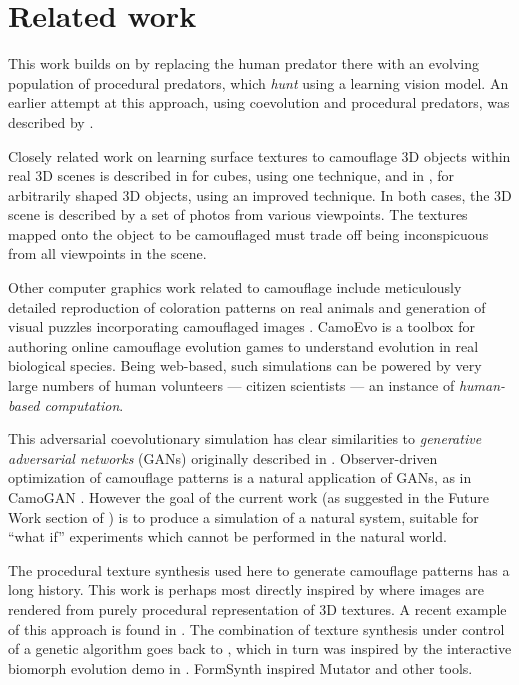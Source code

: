 \documentclass[acmtog]{acmart}
\newcommand{\jargon}[1]{\textit{#1}}
\begin{document}
\section{Related work}
This work builds on \citet{reynolds_iec_2011} by replacing the human predator there with an evolving population of procedural predators, which \jargon{hunt} using a learning vision model. An earlier attempt at this approach, using coevolution and procedural predators, was described by \citet{harrington_coevolution_2014}.
\par
Closely related work on learning surface textures to camouflage 3D objects within real 3D scenes is described in \citet{owens_camouflaging_2014} for cubes, using one technique, and in \citet{guo_ganmouflage_2022}, for arbitrarily shaped 3D objects, using an improved technique. In both cases, the 3D scene is described by a set of photos from various viewpoints. The textures mapped onto the object to be camouflaged must trade off being inconspicuous from all viewpoints in the scene.
\par
Other computer graphics work related to camouflage include meticulously detailed reproduction of coloration patterns on real animals \cite{de_gomensoro_malheiros_leopard_2020} and generation of visual puzzles incorporating camouflaged images \cite{chu_camo_image_2010} \cite{Zhang_Yin_Nie_Zheng_2020}. CamoEvo \cite{hancock_camoevo_2022} is a toolbox for authoring online camouflage evolution games to understand evolution in real biological species. Being web-based, such simulations can be powered by very large numbers of human volunteers — citizen scientists — an instance of \jargon{human-based computation}.
\par
This adversarial coevolutionary simulation has clear similarities to \jargon{generative adversarial networks} (GANs) originally described in \citet{goodfellow_gan_2014}. Observer-driven optimization of camouflage patterns is a natural application of GANs, as in CamoGAN \cite{talas_camogan_2020}. However the goal of the current work (as suggested in the Future Work section of \citet{reynolds_iec_2011}) is to produce a simulation of a natural system, suitable for “what if” experiments which cannot be performed in the natural world.
\par
The procedural texture synthesis used here to generate camouflage patterns has a long history. This work is perhaps most directly inspired by \citet{perlin_image_1985} where images are rendered from purely procedural representation of 3D textures. A recent example of this approach is found in \citet{Guerrero_MatFormer_2022}. The combination of texture synthesis under control of a genetic algorithm goes back to \citet{sims_artificial_1991}, which in turn was inspired by the interactive biomorph evolution demo in \citet{dawkins_blind_1986}. FormSynth \cite{latham_form_1989} inspired Mutator \cite{todd_evolutionary_1994} and other tools.
\end{document}
